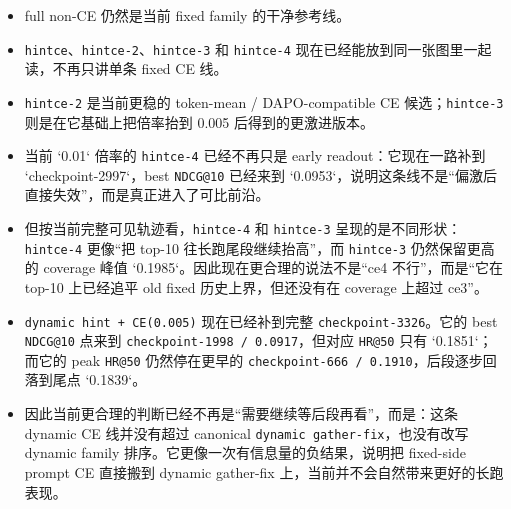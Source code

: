 \begin{itemize}
\item full non-CE 仍然是当前 fixed family 的干净参考线。
\item \texttt{hintce}、\texttt{hintce-2}、\texttt{hintce-3} 和 \texttt{hintce-4} 现在已经能放到同一张图里一起读，不再只讲单条 fixed CE 线。
\item \texttt{hintce-2} 是当前更稳的 token-mean / DAPO-compatible CE 候选；\texttt{hintce-3} 则是在它基础上把倍率抬到 0.005 后得到的更激进版本。
\item 当前 `0.01` 倍率的 \texttt{hintce-4} 已经不再只是 early readout：它现在一路补到 `checkpoint-2997`，best \texttt{NDCG@10} 已经来到 `0.0953`，说明这条线不是“偏激后直接失效”，而是真正进入了可比前沿。
\item 但按当前完整可见轨迹看，\texttt{hintce-4} 和 \texttt{hintce-3} 呈现的是不同形状：\texttt{hintce-4} 更像“把 top-10 往长跑尾段继续抬高”，而 \texttt{hintce-3} 仍然保留更高的 coverage 峰值 `0.1985`。因此现在更合理的说法不是“ce4 不行”，而是“它在 top-10 上已经追平 old fixed 历史上界，但还没有在 coverage 上超过 ce3”。
\item \texttt{dynamic hint + CE(0.005)} 现在已经补到完整 \texttt{checkpoint-3326}。它的 best \texttt{NDCG@10} 点来到 \texttt{checkpoint-1998 / 0.0917}，但对应 \texttt{HR@50} 只有 `0.1851`；而它的 peak \texttt{HR@50} 仍然停在更早的 \texttt{checkpoint-666 / 0.1910}，后段逐步回落到尾点 `0.1839`。
\item 因此当前更合理的判断已经不再是“需要继续等后段再看”，而是：这条 dynamic CE 线并没有超过 canonical \texttt{dynamic gather-fix}，也没有改写 dynamic family 排序。它更像一次有信息量的负结果，说明把 fixed-side prompt CE 直接搬到 dynamic gather-fix 上，当前并不会自然带来更好的长跑表现。
\end{itemize}
